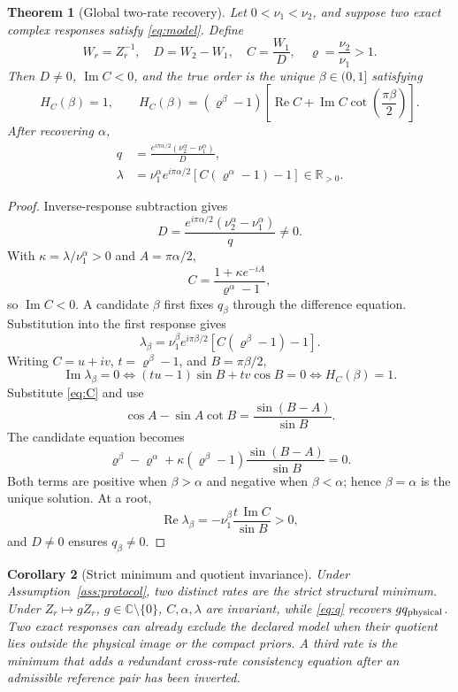 \documentclass[11pt]{article}
\newtheorem{theorem}{Theorem}
\newtheorem{corollary}[theorem]{Corollary}
\theoremstyle{definition}
\theoremstyle{remark}
\newcommand{\C}{\mathbb C}
\newcommand{\R}{\mathbb R}
\begin{document}
\begin{theorem}[Global two-rate recovery]
\label{thm:two-rate}
Let \(0<\nu_1<\nu_2\), and suppose two exact complex responses satisfy
\eqref{eq:model}.  Define
\[
 W_r=Z_r^{-1},\quad D=W_2-W_1,\quad
 C=\frac{W_1}{D},\quad \varrho=\frac{\nu_2}{\nu_1}>1.
\]
Then \(D\ne0\), \(\operatorname{Im}C<0\), and the true order is the unique
\(\beta\in(0,1]\) satisfying
\begin{equation}
 H_C(\beta)=1,\qquad
 H_C(\beta)=(\varrho^\beta-1)
 \left[\operatorname{Re}C+
 \operatorname{Im}C\cot\left(\frac{\pi\beta}{2}\right)\right].
 \label{eq:root}
\end{equation}
After recovering \(\alpha\),
\begin{align}
 q&=\frac{e^{i\pi\alpha/2}(\nu_2^\alpha-\nu_1^\alpha)}{D},
 \label{eq:q}\\
 \lambda&=\nu_1^\alpha e^{i\pi\alpha/2}
 [C(\varrho^\alpha-1)-1]\in\R_{>0}.
 \label{eq:lambda}
\end{align}
\end{theorem}

\begin{proof}
Inverse-response subtraction gives
\[
 D=\frac{e^{i\pi\alpha/2}(\nu_2^\alpha-\nu_1^\alpha)}{q}\ne0.
\]
With \(\kappa=\lambda/\nu_1^\alpha>0\) and \(A=\pi\alpha/2\),
\begin{equation}
 C=\frac{1+\kappa e^{-iA}}{\varrho^\alpha-1},
 \label{eq:C}
\end{equation}
so \(\operatorname{Im}C<0\).  A candidate \(\beta\) first fixes \(q_\beta\)
through the difference equation.  Substitution into the first response gives
\[
 \lambda_\beta=\nu_1^\beta e^{i\pi\beta/2}
 [C(\varrho^\beta-1)-1].
\]
Writing \(C=u+iv\), \(t=\varrho^\beta-1\), and \(B=\pi\beta/2\),
\[
 \operatorname{Im}\lambda_\beta=0
 \iff (tu-1)\sin B+tv\cos B=0
 \iff H_C(\beta)=1.
\]
Substitute \eqref{eq:C} and use
\[
 \cos A-\sin A\cot B=\frac{\sin(B-A)}{\sin B}.
\]
The candidate equation becomes
\begin{equation}
 \varrho^\beta-\varrho^\alpha+
 \kappa(\varrho^\beta-1)\frac{\sin(B-A)}{\sin B}=0.
 \label{eq:sign}
\end{equation}
Both terms are positive when \(\beta>\alpha\) and negative when
\(\beta<\alpha\); hence \(\beta=\alpha\) is the unique solution.  At a root,
\[
 \operatorname{Re}\lambda_\beta
 =-\nu_1^\beta\frac{t\,\operatorname{Im}C}{\sin B}>0,
\]
and \(D\ne0\) ensures \(q_\beta\ne0\).
\end{proof}

\begin{corollary}[Strict minimum and quotient invariance]
Under Assumption~\ref{ass:protocol}, two distinct rates are the strict
structural minimum.  Under \(Z_r\mapsto gZ_r\),
\(g\in\C\setminus\{0\}\), \(C,\alpha,\lambda\) are invariant, while
\eqref{eq:q} recovers \(gq_{\rm physical}\).
Two exact responses can already exclude the declared model when their
quotient lies outside the physical image or the compact priors.  A third rate
is the minimum that adds a redundant cross-rate consistency equation after an
admissible reference pair has been inverted.
\end{corollary}
\end{document}
